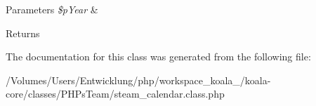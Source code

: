 \begin{DoxyParams}{Parameters}
{\em \$pYear} & \\
\hline
\end{DoxyParams}
\begin{DoxyReturn}{Returns}

\end{DoxyReturn}


The documentation for this class was generated from the following file:\begin{DoxyCompactItemize}
\item 
/Volumes/Users/Entwicklung/php/workspace\_\-koala\_/koala-\/core/classes/PHPsTeam/steam\_\-calendar.class.php\end{DoxyCompactItemize}
